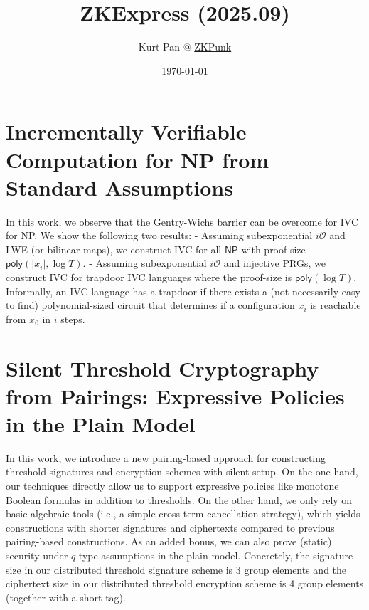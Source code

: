 \documentclass[11pt]{article}
\theoremstyle{definition}
\theoremstyle{remark}
\theoremstyle{plain}
\begin{document}
\title{ZKExpress (2025.09)}
\author{Kurt Pan @ \href{https://zkpunk.pro}{ZKPunk}}
\date{\today}
\maketitle
\tableofcontents

\section{\cite{cryptoeprint:2025/1546} Incrementally Verifiable Computation for NP from Standard Assumptions}
In this work, we observe that the Gentry-Wichs barrier can be overcome for IVC for NP. We show the following two results: - Assuming subexponential $i\mathcal{O}$ and LWE (or bilinear maps), we construct IVC for all $\mathsf{NP}$ with proof size $\mathsf{poly}(|x_i|,\log T)$. - Assuming subexponential $i\mathcal{O}$ and injective PRGs, we construct IVC for trapdoor IVC languages where the proof-size is $\mathsf{poly}(\log T)$. Informally, an IVC language has a trapdoor if there exists a (not necessarily easy to find) polynomial-sized circuit that determines if a configuration $x_i$ is reachable from $x_0$ in $i$ steps.

\section{\cite{cryptoeprint:2025/1547} Silent Threshold Cryptography from Pairings: Expressive Policies in the Plain Model}
 In this work, we introduce a new pairing-based approach for constructing threshold signatures and encryption schemes with silent setup. On the one hand, our techniques directly allow us to support expressive policies like monotone Boolean formulas in addition to thresholds. On the other hand, we only rely on basic algebraic tools (i.e., a simple cross-term cancellation strategy), which yields constructions with shorter signatures and ciphertexts compared to previous pairing-based constructions. As an added bonus, we can also prove (static) security under $q$-type assumptions in the plain model. Concretely, the signature size in our distributed threshold signature scheme is 3 group elements and the ciphertext size in our distributed threshold encryption scheme is 4 group elements (together with a short tag).
\end{document}
